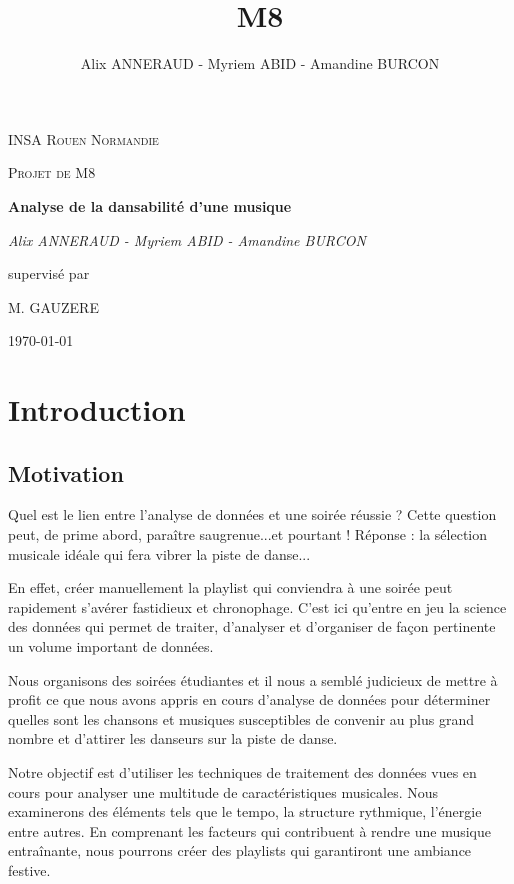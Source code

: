 \documentclass[a4paper, 12pt]{report}
\title{M8}
\author{Alix ANNERAUD - Myriem ABID - Amandine BURCON}
\begin{document}
\begin{titlepage}
	\centering
	{\textsc{INSA Rouen Normandie} \par}
	\vspace{1cm}
	{\Large \textsc{Projet de M8}\par}
	\vspace{1.5cm}
	{\huge\bfseries Analyse de la dansabilité d'une musique\par}
	\vspace{2cm}
	{\Large\itshape Alix ANNERAUD - Myriem ABID - Amandine BURCON\par}
	\vfill
	supervisé par\par
	   M. GAUZERE

	\vfill

	{\large \today\par}
\end{titlepage}



\tableofcontents

\chapter{Introduction}

\section{Motivation}

Quel est le lien entre l'analyse de données et une soirée réussie ? Cette question peut, de prime abord, paraître saugrenue...et pourtant !
Réponse : la sélection musicale idéale qui fera vibrer la piste de danse...

En effet, créer manuellement la playlist qui conviendra à une soirée peut rapidement s'avérer fastidieux et chronophage. C'est ici qu'entre en jeu la science des données qui permet de traiter, d'analyser et d'organiser de façon pertinente un volume important de données.

Nous organisons des soirées étudiantes et il nous a semblé judicieux de mettre à profit ce que nous avons appris en cours d'analyse de données pour déterminer quelles sont les chansons et musiques susceptibles de convenir au plus grand nombre et d'attirer les danseurs sur la piste de danse.

Notre objectif est d'utiliser les techniques de traitement des données vues en cours pour analyser une multitude de caractéristiques musicales. Nous examinerons des éléments tels que le tempo, la structure rythmique, l'énergie entre autres. En comprenant les facteurs qui contribuent à rendre une musique entraînante, nous pourrons créer des playlists qui garantiront une ambiance festive.
\end{document}
